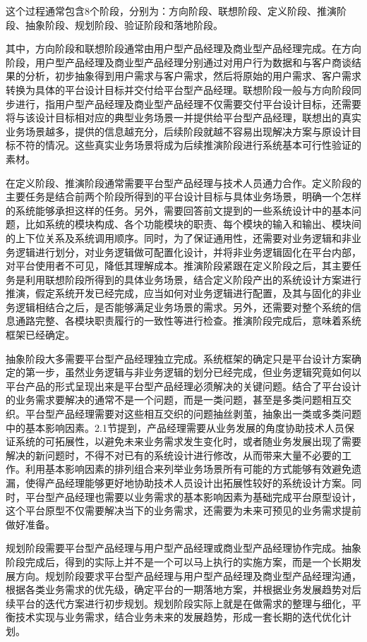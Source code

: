 \documentclass[letterpaper,11pt,english]{sphinxmanual}
\begin{document}
这个过程通常包含8个阶段，分别为：方向阶段、联想阶段、定义阶段、推演阶段、抽象阶段、规划阶段、验证阶段和落地阶段。

其中，方向阶段和联想阶段通常由用户型产品经理及商业型产品经理完成。在方向阶段，用户型产品经理及商业型产品经理分别通过对用户行为数据和与客户商谈结果的分析，初步抽象得到用户需求与客户需求，然后将原始的用户需求、客户需求转换为具体的平台设计目标并交付给平台型产品经理。联想阶段一般与方向阶段同步进行，指用户型产品经理及商业型产品经理不仅需要交付平台设计目标，还需要将与该设计目标相对应的典型业务场景一并提供给平台型产品经理，联想出的真实业务场景越多，提供的信息越充分，后续阶段就越不容易出现解决方案与原设计目标不符的情况。这些真实业务场景将成为后续推演阶段进行系统基本可行性验证的素材。

在定义阶段、推演阶段通常需要平台型产品经理与技术人员通力合作。定义阶段的主要任务是结合前两个阶段所得到的平台设计目标与具体业务场景，明确一个怎样的系统能够承担这样的任务。另外，需要回答前文提到的一些系统设计中的基本问题，比如系统的模块构成、各个功能模块的职责、每个模块的输入和输出、模块间的上下位关系及系统调用顺序。同时，为了保证通用性，还需要对业务逻辑和非业务逻辑进行划分，对业务逻辑做可配置化设计，并将非业务逻辑固化在平台内部，对平台使用者不可见，降低其理解成本。推演阶段紧跟在定义阶段之后，其主要任务是利用联想阶段所得到的具体业务场景，结合定义阶段产出的系统设计方案进行推演，假定系统开发已经完成，应当如何对业务逻辑进行配置，及其与固化的非业务逻辑相结合之后，是否能够满足业务场景的需求。另外，还需要对整个系统的信息通路完整、各模块职责履行的一致性等进行检查。推演阶段完成后，意味着系统框架已经确定。

抽象阶段大多需要平台型产品经理独立完成。系统框架的确定只是平台设计方案确定的第一步，虽然业务逻辑与非业务逻辑的划分已经完成，但业务逻辑究竟如何以平台产品的形式呈现出来是平台型产品经理必须解决的关键问题。结合了平台设计的业务需求要解决的通常不是一个问题，而是一类问题，甚至是多类问题相互交织。平台型产品经理需要对这些相互交织的问题抽丝剥茧，抽象出一类或多类问题中的基本影响因素。2.1节提到，产品经理需要从业务发展的角度协助技术人员保证系统的可拓展性，以避免未来业务需求发生变化时，或者随业务发展出现了需要解决的新问题时，不得不对已有的系统设计进行修改，从而带来大量不必要的工作。利用基本影响因素的排列组合来列举业务场景所有可能的方式能够有效避免遗漏，使得产品经理能够更好地协助技术人员设计出拓展性较好的系统设计方案。同时，平台型产品经理也需要以业务需求的基本影响因素为基础完成平台原型设计，这个平台原型不仅需要解决当下的业务需求，还需要为未来可预见的业务需求提前做好准备。

规划阶段需要平台型产品经理与用户型产品经理或商业型产品经理协作完成。抽象阶段完成后，得到的实际上并不是一个可以马上执行的实施方案，而是一个长期发展方向。规划阶段要求平台型产品经理与用户型产品经理及商业型产品经理沟通，根据各类业务需求的优先级，确定平台的一期落地方案，并根据业务发展趋势对后续平台的迭代方案进行初步规划。规划阶段实际上就是在做需求的整理与细化，平衡技术实现与业务需求，结合业务未来的发展趋势，形成一套长期的迭代优化计划。
\end{document}
